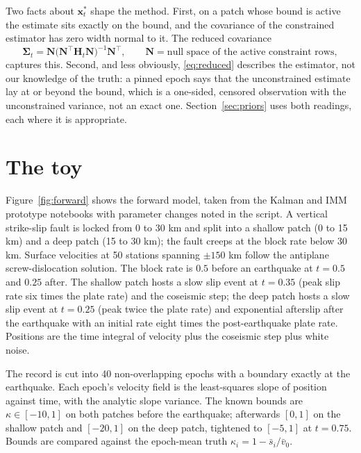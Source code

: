 \documentclass[11pt]{article}
\newcommand{\vect}[1]{\bm{#1}}
\newcommand{\mat}[1]{\mathbf{#1}}
\begin{document}
Two facts about $\vect{x}_t^\ast$ shape the method. First, on a patch whose bound is active the estimate sits exactly on the bound, and the covariance of the constrained estimator has zero width normal to it. The reduced covariance
\begin{equation}
\mat{\Sigma}_t = \mat{N}\bigl(\mat{N}^{\!\top}\mat{H}_t\mat{N}\bigr)^{-1}\mat{N}^{\!\top},
\qquad \mat{N} = \text{null space of the active constraint rows},
\label{eq:reduced}
\end{equation}
captures this. Second, and less obviously, \eqref{eq:reduced} describes the estimator, not our knowledge of the truth: a pinned epoch says that the unconstrained estimate lay at or beyond the bound, which is a one-sided, censored observation with the unconstrained variance, not an exact one. Section~\ref{sec:priors} uses both readings, each where it is appropriate.

\section{The toy}

Figure~\ref{fig:forward} shows the forward model, taken from the Kalman and IMM prototype notebooks with parameter changes noted in the script. A vertical strike-slip fault is locked from 0 to 30 km and split into a shallow patch (0 to 15 km) and a deep patch (15 to 30 km); the fault creeps at the block rate below 30 km. Surface velocities at 50 stations spanning $\pm 150$ km follow the antiplane screw-dislocation solution. The block rate is $0.5$ before an earthquake at $t = 0.5$ and $0.25$ after. The shallow patch hosts a slow slip event at $t = 0.35$ (peak slip rate six times the plate rate) and the coseismic step; the deep patch hosts a slow slip event at $t = 0.25$ (peak twice the plate rate) and exponential afterslip after the earthquake with an initial rate eight times the post-earthquake plate rate. Positions are the time integral of velocity plus the coseismic step plus white noise.

The record is cut into 40 non-overlapping epochs with a boundary exactly at the earthquake. Each epoch's velocity field is the least-squares slope of position against time, with the analytic slope variance. The known bounds are $\kappa \in [-10, 1]$ on both patches before the earthquake; afterwards $[0, 1]$ on the shallow patch and $[-20, 1]$ on the deep patch, tightened to $[-5, 1]$ at $t = 0.75$. Bounds are compared against the epoch-mean truth $\kappa_i = 1 - \bar{s}_i / \bar{v}_0$.
\end{document}
